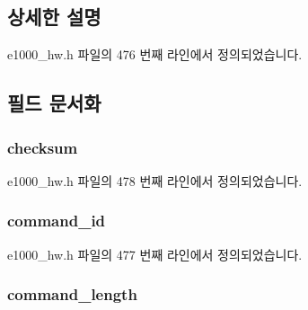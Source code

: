 \subsection{상세한 설명}


e1000\+\_\+hw.\+h 파일의 476 번째 라인에서 정의되었습니다.



\subsection{필드 문서화}
\subsubsection[{\texorpdfstring{checksum}{checksum}}]{ checksum}\hypertarget{structe1000__host__mng__command__header_afd93107fee98407f162be1294fb053fd}{}\label{structe1000__host__mng__command__header_afd93107fee98407f162be1294fb053fd}


e1000\+\_\+hw.\+h 파일의 478 번째 라인에서 정의되었습니다.

\subsubsection[{\texorpdfstring{command\+\_\+id}{command_id}}]{ command\+\_\+id}\hypertarget{structe1000__host__mng__command__header_aa5d253518ff72b4ed6148c872420aa46}{}\label{structe1000__host__mng__command__header_aa5d253518ff72b4ed6148c872420aa46}


e1000\+\_\+hw.\+h 파일의 477 번째 라인에서 정의되었습니다.

\subsubsection[{\texorpdfstring{command\+\_\+length}{command_length}}]{ command\+\_\+length}\hypertarget{structe1000__host__mng__command__header_ae417ce9126652dc4c9652aeb0a44ad32}{}\label{structe1000__host__mng__command__header_ae417ce9126652dc4c9652aeb0a44ad32}


